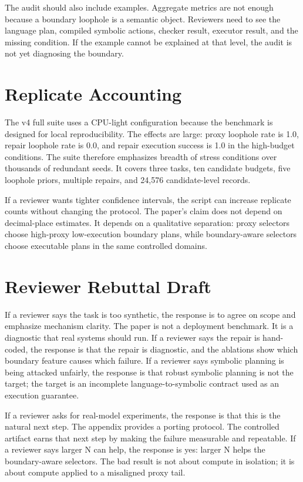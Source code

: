 \documentclass{article}
\begin{document}
The audit should also include examples. Aggregate metrics are not enough
because a boundary loophole is a semantic object. Reviewers need to see the
language plan, compiled symbolic actions, checker result, executor result, and
the missing condition. If the example cannot be explained at that level, the
audit is not yet diagnosing the boundary.

\section{Replicate Accounting}

The v4 full suite uses a CPU-light configuration because the benchmark is
designed for local reproducibility. The effects are large: proxy loophole rate
is 1.0, repair loophole rate is 0.0, and repair execution success is 1.0 in
the high-budget conditions. The suite therefore emphasizes breadth of stress
conditions over thousands of redundant seeds. It covers three tasks, ten
candidate budgets, five loophole priors, multiple repairs, and 24,576
candidate-level records.

If a reviewer wants tighter confidence intervals, the script can increase
replicate counts without changing the protocol. The paper's claim does not
depend on decimal-place estimates. It depends on a qualitative separation:
proxy selectors choose high-proxy low-execution boundary plans, while
boundary-aware selectors choose executable plans in the same controlled
domains.

\section{Reviewer Rebuttal Draft}

If a reviewer says the task is too synthetic, the response is to agree on scope
and emphasize mechanism clarity. The paper is not a deployment benchmark. It
is a diagnostic that real systems should run. If a reviewer says the repair is
hand-coded, the response is that the repair is diagnostic, and the ablations
show which boundary feature causes which failure. If a reviewer says symbolic
planning is being attacked unfairly, the response is that robust symbolic
planning is not the target; the target is an incomplete language-to-symbolic
contract used as an execution guarantee.

If a reviewer asks for real-model experiments, the response is that this is the
natural next step. The appendix provides a porting protocol. The controlled
artifact earns that next step by making the failure measurable and repeatable.
If a reviewer says larger N can help, the response is yes: larger N helps the
boundary-aware selectors. The bad result is not about compute in isolation; it
is about compute applied to a misaligned proxy tail.
\end{document}
